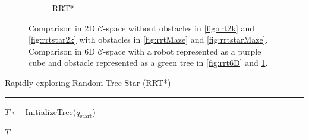 \documentclass{ctuthesis}
\begin{document}
\begin{figure}[!ht]
\begin{subfigure}[b]{0.45\textwidth}
      \caption{RRT*.}
      \label{fig:rrtstar6D}
  \end{subfigure} 
  \caption{Comparison in 2D $\mathcal{C}$-space without obstacles in \ref{fig:rrt2k} 
  and \ref{fig:rrtstar2k} with obstacles in \ref{fig:rrtMaze} and \ref{fig:rrtstarMaze}.
  Comparison in 6D $\mathcal{C}$-space with a robot represented as a purple cube and obstacle 
  represented as a green tree in \ref{fig:rrt6D} and \ref{fig:rrtstar6D}.}
  \label{fig:RRTvsRRTstar}
\end{figure}
\begin{algorithm}[H]
  \caption{Rapidly-exploring Random Tree Star (RRT*)}
  \label{alg:rrt_star}
  
  \vspace{0.1cm}
  \hrule
  \vspace{0.2cm}
  $T \leftarrow$ InitializeTree($q_{\text{start}}$)\;
  

  \Return $T$\; 
\end{algorithm} 

\clearpage 
\end{document}
